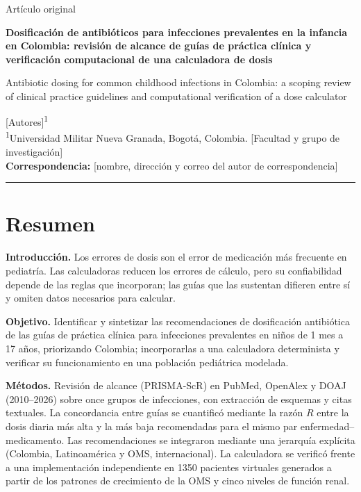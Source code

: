 \documentclass[11pt,a4paper]{article}
\newcommand{\pendiente}[1]{\textcolor{rojo}{[#1]}}
\begin{document}
\thispagestyle{plain}

\begin{flushleft}
{\sffamily\small\color{gris}Artículo original}\\[6pt]
{\sffamily\LARGE\bfseries Dosificación de antibióticos para infecciones prevalentes en la infancia en Colombia: revisión de alcance de guías de práctica clínica y verificación computacional de una calculadora de dosis\par}
\vspace{8pt}
{\sffamily\large Antibiotic dosing for common childhood infections in Colombia: a scoping review of clinical practice guidelines and computational verification of a dose calculator\par}
\vspace{12pt}
{\normalsize \pendiente{Autores}\textsuperscript{1}}\\[2pt]
{\small\textsuperscript{1}Universidad Militar Nueva Granada, Bogotá, Colombia. \pendiente{Facultad y grupo de investigación}}\\[2pt]
{\small\textbf{Correspondencia:} \pendiente{nombre, dirección y correo del autor de correspondencia}}
\end{flushleft}

\vspace{4pt}
\noindent\rule{\textwidth}{0.4pt}

\section{Resumen}

\noindent\textbf{Introducción.} Los errores de dosis son el error de medicación más frecuente en pediatría. Las calculadoras reducen los errores de cálculo, pero su confiabilidad depende de las reglas que incorporan; las guías que las sustentan difieren entre sí y omiten datos necesarios para calcular.

\noindent\textbf{Objetivo.} Identificar y sintetizar las recomendaciones de dosificación antibiótica de las guías de práctica clínica para infecciones prevalentes en niños de 1 mes a 17 años, priorizando Colombia; incorporarlas a una calculadora determinista y verificar su funcionamiento en una población pediátrica modelada.

\noindent\textbf{Métodos.} Revisión de alcance (PRISMA-ScR) en PubMed, OpenAlex y DOAJ (2010--2026) sobre once grupos de infecciones, con extracción de esquemas y citas textuales. La concordancia entre guías se cuantificó mediante la razón $R$ entre la dosis diaria más alta y la más baja recomendadas para el mismo par enfermedad--medicamento. Las recomendaciones se integraron mediante una jerarquía explícita (Colombia, Latinoamérica y OMS, internacional). La calculadora se verificó frente a una implementación independiente en \num{1350} pacientes virtuales generados a partir de los patrones de crecimiento de la OMS y cinco niveles de función renal.
\end{document}
